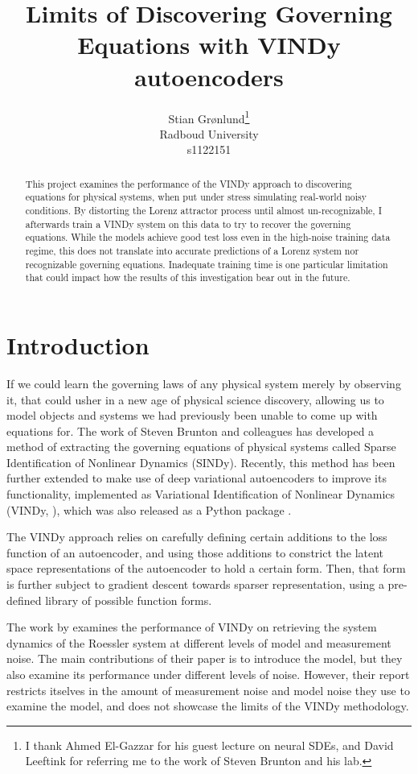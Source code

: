 \documentclass{article}
\title{Limits of Discovering Governing Equations with VINDy autoencoders}
\author{
  Stian Grønlund\thanks{I thank Ahmed El-Gazzar for his guest lecture on neural SDEs, and David Leeftink for referring me to the work of Steven Brunton and his lab.} \\
  Radboud University\\
  s1122151
}
\begin{document}
\maketitle

\begin{abstract}
  This project examines the performance of the VINDy \citep{contiVENIVINDyVICI2024} approach to discovering equations for physical systems, when put under stress simulating real-world noisy conditions. By distorting the Lorenz attractor process until almost un-recognizable, I afterwards train a VINDy system on this data to try to recover the governing equations. While the models achieve good test loss even in the high-noise training data regime, this does not translate into accurate predictions of a Lorenz system nor recognizable governing equations. Inadequate training time is one particular limitation that could impact how the results of this investigation bear out in the future.
\end{abstract}

\section{Introduction}
\label{introduction}

If we could learn the governing laws of any physical system merely by observing it, that could usher in a new age of physical science discovery, allowing us to model objects and systems we had previously been unable to come up with equations for. The work of Steven Brunton and colleagues \citep{bruntonDiscoveringGoverningEquations2016,championDatadrivenDiscoveryCoordinates2019} has developed a method of extracting the governing equations of physical systems called Sparse Identification of Nonlinear Dynamics (SINDy). Recently, this method has been further extended to make use of deep variational autoencoders to improve its functionality, implemented as Variational Identification of Nonlinear Dynamics (VINDy, \citet{contiVENIVINDyVICI2024}), which was also released as a Python package \citep{contiVENIVINDyVICI2024}.

The VINDy approach relies on carefully defining certain additions to the loss function of an autoencoder, and using those additions to constrict the latent space representations of the autoencoder to hold a certain form. Then, that form is further subject to gradient descent towards sparser representation, using a pre-defined library of possible function forms.

The work by \citet{contiVENIVINDyVICI2024} examines the performance of VINDy on retrieving the system dynamics of the Roessler system at different levels of model and measurement noise. The main contributions of their paper is to introduce the model, but they also examine its performance under different levels of noise. However, their report restricts itselves in the amount of measurement noise and model noise they use to examine the model, and does not showcase the limits of the VINDy methodology.
\end{document}
